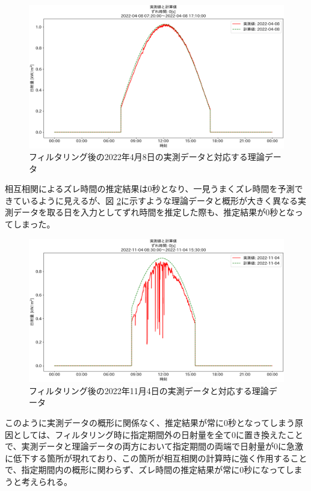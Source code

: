 \documentclass[a4j,12pt,]{jarticle}
\begin{document}
\begin{figure}[H]
  \begin{center}
    \includegraphics[width=160mm]{2022-04-08_partial_corr.png}
    \caption{フィルタリング後の2022年4月8日の実測データと対応する理論データ}
    \label{p6}
  \end{center}
\end{figure}

相互相関によるズレ時間の推定結果は0秒となり、一見うまくズレ時間を予測できているように見えるが、図 \ref{p7}に示すような理論データと概形が大きく異なる実測データを取る日を入力としてずれ時間を推定した際も、推定結果が0秒となってしまった。

\begin{figure}[H]
  \begin{center}
    \includegraphics[width=160mm]{2022-11-04_partial_corr.png}
    \caption{フィルタリング後の2022年11月4日の実測データと対応する理論データ}
    \label{p7}
  \end{center}
\end{figure}

このように実測データの概形に関係なく、推定結果が常に0秒となってしまう原因としては、フィルタリング時に指定期間外の日射量を全て0に置き換えたことで、実測データと理論データの両方において指定期間の両端で日射量が0に急激に低下する箇所が現れており、この箇所が相互相関の計算時に強く作用することで、指定期間内の概形に関わらず、ズレ時間の推定結果が常に0秒になってしまうと考えられる。
\end{document}
